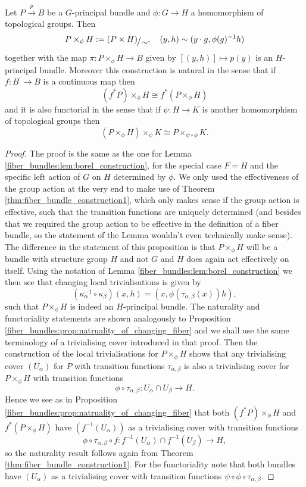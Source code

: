 \begin{proposition}
    \label{fiber_bundles:prop:borel_construction_part2}
    Let $P \xrightarrow{p} B$ be a $G$-principal bundle and $\phi \colon G \to H$ a homomorphism of topological groups. Then 
    \[
    P \times_\phi H := \modulo{(P \times H)}{\sim}, \quad (y,h) \sim (y\cdot g, \phi(g)^{-1}h)
    \]
    together with the map $\pi \colon P \times_\phi H \to B$ given by $[(y,h)] \mapsto p(y)$ is an $H$-principal bundle. Moreover this construction is natural in the sense that if $f \colon B^\prime \to B$ is a continuous map then 
    \[
    (f^\ast P) \times_\phi H \cong f^\ast (P \times_\phi H)
    \]
    and it is also functorial in the sense that if $\psi \colon H \to K$ is another homomorphism of topological groups then 
    \[
    (P \times_\phi H) \times_\psi K \cong P \times_{\psi \circ \phi} K.
    \]
\end{proposition}

\begin{proof}
    The proof is the same as the one for Lemma \ref{fiber_bundles:lem:borel_construction}, for the special case $F = H$ and the specific left action of $G$ on $H$ determined by $\phi$. We only used the effectiveness of the group action at the very end to make use of Theorem \ref{thm:fiber_bundle_construction1}, which only makes sense if the group action is effective, such that the transition functions are uniquely determined (and besides that we required the group action to be effective in the definition of a fiber bundle, so the statement of the Lemma wouldn't even technically make sense). The difference in the statement of this proposition is that $P \times_\phi H$ will be a bundle with structure group $H$ and not $G$ and $H$ does again act effectively on itself. Using the notation of Lemma \ref{fiber_bundles:lem:borel_construction} we then see that changing local trivialisations is given by 
    \[
        (\kappa_\alpha^{-1} \circ \kappa_\beta)(x,h) = (x,\phi(\tau_{\alpha,\beta}(x)) h),
    \]
    such that $P \times_\phi H$ is indeed an $H$-principal bundle. The naturality and functoriality statements are shown analogously to Proposition \ref{fiber_bundles:prop:natruality_of_changing_fiber} and we shall use the same terminology of a trivialising cover introduced in that proof. Then the construction of the local trivialisations for $P \times_\phi H$ shows that any trivialising cover $(U_\alpha)$ for $P$ with transition functions $\tau_{\alpha,\beta}$ is also a trivialising cover for $P \times_\phi H$ with transition functions 
    \[
    \phi \circ \tau_{\alpha,\beta} \colon U_\alpha \cap U_\beta \to H.
    \]
    Hence we see as in Proposition \ref{fiber_bundles:prop:natruality_of_changing_fiber} that both $(f^\ast P) \times_\phi H$ and $f^\ast (P \times_\phi H)$ have $(f^{-1}(U_\alpha))$ as a trivialising cover with transition functions 
    \[
    \phi \circ \tau_{\alpha,\beta} \circ f \colon f^{-1}(U_\alpha) \cap f^{-1}(U_\beta) \to H,
    \]
    so the naturality result follows again from Theorem \ref{thm:fiber_bundle_construction1}. For the functoriality note that both bundles have $(U_\alpha)$ as a trivialising cover with transition functions $\psi \circ \phi \circ \tau_{\alpha,\beta}$.
\end{proof}

